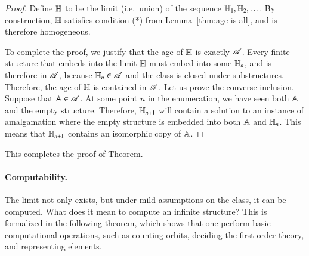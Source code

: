 \begin{proof}
		 Define $\mathbb H$ to be the limit (i.e.~union) of the sequence $\mathbb H_1,\mathbb H_2,\ldots$.  By construction, $\mathbb H$ satisfies condition (*) from Lemma~\ref{thm:age-is-all}, and is therefore homogeneous. 


		 
		 To complete the proof, we justify that the age of $\mathbb H$ is exactly $\mathscr A$. 
		 Every finite structure that embeds into the limit $\mathbb H$ must embed into some $\mathbb H_n$, and is therefore in $\mathscr A$, because $\mathbb H_n \in \mathscr A$ and the class is closed under substructures. Therefore, the age of $\mathbb H$ is contained in $\mathscr A$. Let us prove the converse inclusion. Suppose that $\mathbb A \in \mathscr A$. At some point $n$ in the enumeration, we have seen both $\mathbb A$ and the empty structure. Therefore, $\mathbb H_{n+1}$ will contain a solution to an instance of amalgamation where the empty structure is embedded into both $\mathbb A$ and $\mathbb H_{n}$. This means that $\mathbb H_{n+1}$ contains an isomorphic copy of $\mathbb A$.
	\end{proof}

This completes the proof of \fraisse Theorem. 


\paragraph*{Computability.} 
The \fraisse limit not only exists, but under mild assumptions on the \fraisse class, it can be computed. What does it mean to compute an infinite structure? This is formalized in the following theorem, which shows that one perform basic computational operations, such as counting orbits, deciding the first-order theory, and representing elements. 


